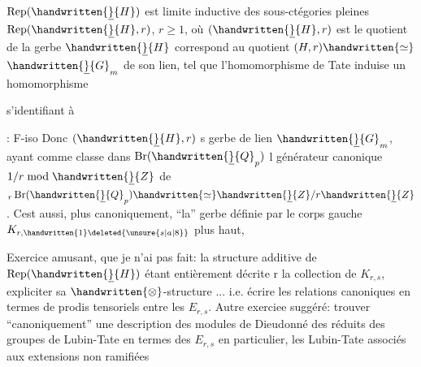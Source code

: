 $\operatorname{Rep}(\handwritten{\underline}{H})$ est limite inductive des sous-ctégories pleines $\operatorname{Rep}(\handwritten{\underline}{H},r)$, $r\geq1$, où $(\handwritten{\underline}{H},r)$ est le quotient de la gerbe $\handwritten{\underline}{H}$ correspond au quotient $(H,r)\handwritten{\simeq}$$\handwritten{\underline}{G}_m$ de son lien, tel que l'homomorphisme de Tate  induise un homomorphisme  s'identifiant à  : F-iso Donc $(\handwritten{\underline}{H},r)$  s  gerbe de lien $\handwritten{\underline}{G}_m$, ayant comme classe dans $\operatorname{Br}(\handwritten{\underline}{Q}_p)$ l générateur canonique $1/r\bmod\handwritten{\underline}{Z}$ de ${}_r\operatorname{Br}(\handwritten{\underline}{Q}_p)\handwritten{\simeq}\handwritten{\underline}{Z}/r\handwritten{\underline}{Z}$. C\rlap{,}est aussi, plus canoniquement, ``la'' gerbe définie par le corps gauche $K_{r,\handwritten{1}\deleted{\unsure{s|a|8}}}$ plus haut, 

\handwritten{[}Exercice amusant, que je n'ai pas fait: la structure additive de $\operatorname{Rep}(\handwritten{\underline}{H})$ étant entièrement décrite  r la collection de $K_{r,s}$, expliciter sa $\handwritten{\otimes}$-structure ... i.e. écrire les relations canoniques en termes de prodis tensoriels entre les $E_{r,s}$. Autre exerciee suggéré: trouver ``canoniquement'' une description des modules de Dieudonné des réduits des groupes de Lubin-Tate en termes des $E_{r,s}$  \handwritten{\unsure{(|[}}en particulier, les Lubin-Tate associés aux extensions non ramifiées

